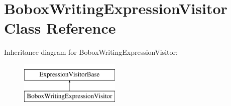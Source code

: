 \hypertarget{class_bobox_writing_expression_visitor}{\section{Bobox\+Writing\+Expression\+Visitor Class Reference}
\label{class_bobox_writing_expression_visitor}
}
Inheritance diagram for Bobox\+Writing\+Expression\+Visitor\+:\begin{figure}[H]
\begin{center}
\leavevmode
\includegraphics[height=2.000000cm]{class_bobox_writing_expression_visitor}
\end{center}
\end{figure}
